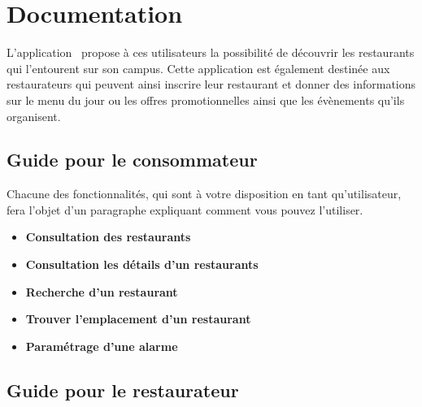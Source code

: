 \section{Documentation}

L'application \appname~propose à ces utilisateurs la possibilité de découvrir les restaurants qui l'entourent sur son campus. Cette application est également destinée aux restaurateurs qui peuvent ainsi inscrire leur restaurant et donner des informations sur le menu du jour ou les offres promotionnelles ainsi que les évènements qu'ils organisent.

\subsection{Guide pour le consommateur}

Chacune des fonctionnalités, qui sont à votre disposition en tant qu'utilisateur, fera l'objet d'un paragraphe expliquant comment vous pouvez l'utiliser.


\begin{itemize}
    \item[] \bf{Consultation des restaurants}
    \item[] \bf{Consultation les détails d'un restaurants}
    \item[] \bf{Recherche d'un restaurant}
    \item[] \bf{Trouver l'emplacement d'un restaurant}
    \item[] \bf{Paramétrage d'une alarme}
\end{itemize}

\subsection{Guide pour le restaurateur}

